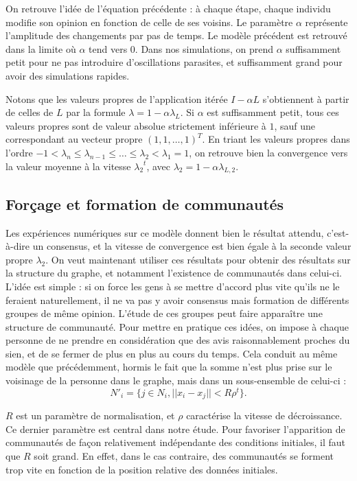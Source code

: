 \documentclass[12pt]{article}
\begin{document}
On retrouve l'idée de l'équation précédente : à chaque étape, chaque
individu modifie son opinion en fonction de celle de ses voisins. Le
paramètre $\alpha$ représente l'amplitude des changements par pas de
temps. Le modèle précédent est retrouvé dans la limite où $\alpha$
tend vers 0. Dans nos simulations, on prend $\alpha$ suffisamment
petit pour ne pas introduire d'oscillations parasites, et suffisamment
grand pour avoir des simulations rapides.

Notons que les valeurs propres de l'application itérée $I - \alpha L$
s'obtiennent à partir de celles de $L$ par la formule $\lambda = 1 -
\alpha \lambda_L$. Si $\alpha$ est suffisamment petit, tous ces
valeurs propres sont de valeur absolue strictement inférieure à $1$,
sauf une correspondant au vecteur propre $(1, 1, \dots, 1)^T$. En
triant les valeurs propres dans l'ordre $-1 < \lambda_n \leq
\lambda_{n-1} \leq \dots \leq \lambda_2 < \lambda_1 = 1$, on
retrouve bien la convergence vers la valeur moyenne à la vitesse
${\lambda_2}^t$, avec $\lambda_2 = 1 - \alpha \lambda_{L,2}$.

\subsection{Forçage et formation de communautés}
\label{forçage}
Les expériences numériques sur ce modèle donnent bien le résultat
attendu, c'est-à-dire un consensus, et la vitesse de convergence est
bien égale à la seconde valeur propre $\lambda_2$. On veut maintenant
utiliser ces résultats pour obtenir des résultats sur la structure du
graphe, et notamment l'existence de communautés dans celui-ci. L'idée
est simple : si on force les gens à se mettre d'accord plus vite
qu'ils ne le feraient naturellement, il ne va pas y avoir
consensus mais formation de différents groupes de même
opinion. L'étude de ces groupes peut faire apparaître une structure de
communauté. Pour mettre en pratique ces idées, on impose à chaque
personne de ne prendre en considération que des avis raisonnablement
proches du sien, et de se fermer de plus en plus au cours du
temps. Cela conduit au même modèle que précédemment, hormis le fait que la
somme n'est plus prise sur le voisinage de la personne dans le graphe,
mais dans un sous-ensemble de celui-ci : $$N'_{i} = \{j \in N_i, ||x_i
- x_j|| < R \rho^t\}.$$

$R$ est un paramètre de normalisation, et $\rho$ caractérise la vitesse de
décroissance. Ce dernier paramètre est central dans notre étude. Pour
favoriser l'apparition de communautés de façon relativement indépendante des
conditions initiales, il faut que $R$ soit grand. En effet, dans le cas
contraire, des communautés se forment trop vite en fonction de la position
relative des données initiales.
\end{document}

